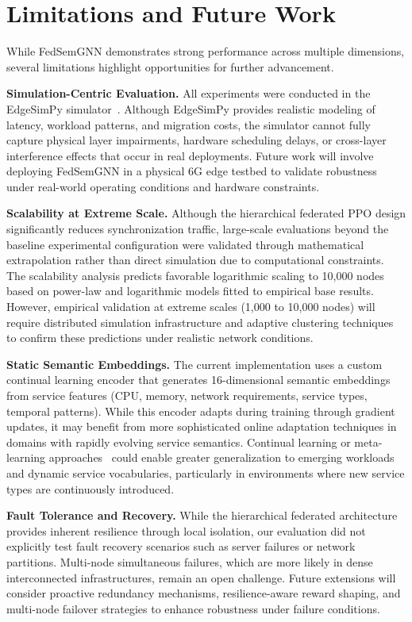 \section{Limitations and Future Work}
\label{sec:limitations_future}

While FedSemGNN demonstrates strong performance across multiple dimensions, several limitations highlight opportunities for further advancement.

\textbf{Simulation-Centric Evaluation.}
All experiments were conducted in the EdgeSimPy simulator~\cite{edgesimpy}. Although EdgeSimPy provides realistic modeling of latency, workload patterns, and migration costs, the simulator cannot fully capture physical layer impairments, hardware scheduling delays, or cross-layer interference effects that occur in real deployments. Future work will involve deploying FedSemGNN in a physical 6G edge testbed to validate robustness under real-world operating conditions and hardware constraints.

\textbf{Scalability at Extreme Scale.}
Although the hierarchical federated PPO design significantly reduces synchronization traffic, large-scale evaluations beyond the baseline experimental configuration were validated through mathematical extrapolation rather than direct simulation due to computational constraints. The scalability analysis predicts favorable logarithmic scaling to 10,000 nodes based on power-law and logarithmic models fitted to empirical base results. However, empirical validation at extreme scales (1,000 to 10,000 nodes) will require distributed simulation infrastructure and adaptive clustering techniques~\cite{Zhou2023_MARLFed, Bonawitz2019TowardsFL} to confirm these predictions under realistic network conditions.

\textbf{Static Semantic Embeddings.}
The current implementation uses a custom continual learning encoder that generates 16-dimensional semantic embeddings from service features (CPU, memory, network requirements, service types, temporal patterns). While this encoder adapts during training through gradient updates, it may benefit from more sophisticated online adaptation techniques in domains with rapidly evolving service semantics. Continual learning or meta-learning approaches~\cite{Hu2023_PersonalizedFL} could enable greater generalization to emerging workloads and dynamic service vocabularies, particularly in environments where new service types are continuously introduced.

\textbf{Fault Tolerance and Recovery.}
While the hierarchical federated architecture provides inherent resilience through local isolation, our evaluation did not explicitly test fault recovery scenarios such as server failures or network partitions. Multi-node simultaneous failures, which are more likely in dense interconnected infrastructures, remain an open challenge. Future extensions will consider proactive redundancy mechanisms, resilience-aware reward shaping, and multi-node failover strategies to enhance robustness under failure conditions.

